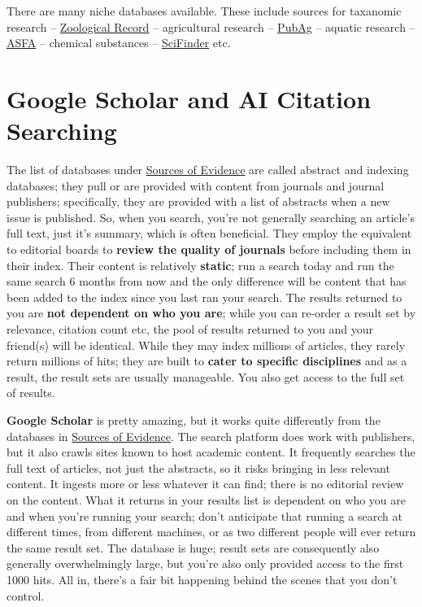 \documentclass[
]{book}
\begin{document}
There are many niche databases available. These include sources for taxanomic research -- \href{https://resources.library.ubc.ca/page.php?details=zoological-record\&id=1121}{Zoological Record} -- agricultural research -- \href{https://resources.library.ubc.ca/page.php?details=pubag\&id=2250}{PubAg} -- aquatic research -- \href{https://resources.library.ubc.ca/page.php?id=108}{ASFA} -- chemical substances -- \href{https://resources.library.ubc.ca/page.php?id=293}{SciFinder} etc.

\hypertarget{google-scholar-and-ai-citation-searching}{%
\section{Google Scholar and AI Citation Searching}\label{google-scholar-and-ai-citation-searching}}

The list of databases under \href{}{Sources of Evidence} are called abstract and indexing databases; they pull or are provided with content from journals and journal publishers; specifically, they are provided with a list of abstracts when a new issue is published. So, when you search, you're not generally searching an article's full text, just it's summary, which is often beneficial. They employ the equivalent to editorial boards to \textbf{review the quality of journals} before including them in their index. Their content is relatively \textbf{static}; run a search today and run the same search 6 months from now and the only difference will be content that has been added to the index since you last ran your search. The results returned to you are \textbf{not dependent on who you are}; while you can re-order a result set by relevance, citation count etc, the pool of results returned to you and your friend(s) will be identical. While they may index millions of articles, they rarely return millions of hits; they are built to \textbf{cater to specific disciplines} and as a result, the result sets are usually manageable. You also get access to the full set of results.

\textbf{Google Scholar} is pretty amazing, but it works quite differently from the databases in \href{}{Sources of Evidence}. The search platform does work with publishers, but it also crawls sites known to host academic content. It frequently searches the full text of articles, not just the abstracts, so it risks bringing in less relevant content. It ingests more or less whatever it can find; there is no editorial review on the content. What it returns in your results list is dependent on who you are and when you're running your search; don't anticipate that running a search at different times, from different machines, or as two different people will ever return the same result set. The database is huge; result sets are consequently also generally overwhelmingly large, but you're also only provided access to the first 1000 hits. All in, there's a fair bit happening behind the scenes that you don't control.
\end{document}
